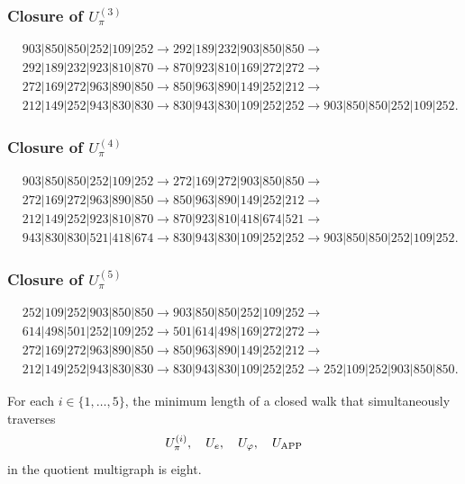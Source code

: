 \subsubsection{Closure of \texorpdfstring{\(U_\pi^{(3)}\)}{U-pi 3}}
\begin{align*}
&903|850|850|252|109|252\to
292|189|232|903|850|850\to\\
&292|189|232|923|810|870\to
870|923|810|169|272|272\to\\
&272|169|272|963|890|850\to
850|963|890|149|252|212\to\\
&212|149|252|943|830|830\to
830|943|830|109|252|252\to
903|850|850|252|109|252.
\end{align*}

\subsubsection{Closure of \texorpdfstring{\(U_\pi^{(4)}\)}{U-pi 4}}
\begin{align*}
&903|850|850|252|109|252\to
272|169|272|903|850|850\to\\
&272|169|272|963|890|850\to
850|963|890|149|252|212\to\\
&212|149|252|923|810|870\to
870|923|810|418|674|521\to\\
&943|830|830|521|418|674\to
830|943|830|109|252|252\to
903|850|850|252|109|252.
\end{align*}

\subsubsection{Closure of \texorpdfstring{\(U_\pi^{(5)}\)}{U-pi 5}}
\begin{align*}
&252|109|252|903|850|850\to
903|850|850|252|109|252\to\\
&614|498|501|252|109|252\to
501|614|498|169|272|272\to\\
&272|169|272|963|890|850\to
850|963|890|149|252|212\to\\
&212|149|252|943|830|830\to
830|943|830|109|252|252\to
252|109|252|903|850|850.
\end{align*}

\begin{theorem}
\label{p12-83-c8-s1:thm:minimalidad-cierres-pi-autonoma}
For each \(i\in\{1,\ldots,5\}\), the minimum length of a closed walk
that simultaneously traverses
\[
 U_\pi^{(i)},\quad U_e,\quad U_\varphi,\quad U_{\rm APP}
\]
in the quotient multigraph is eight.
\end{theorem}

